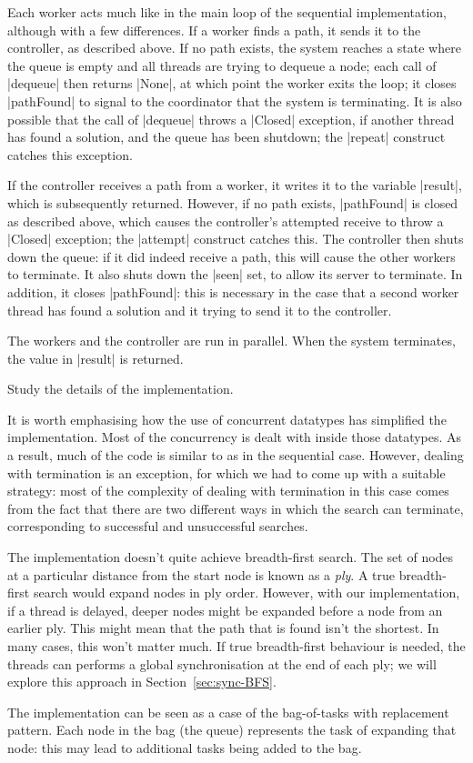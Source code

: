 
Each worker acts much like in the main loop of the sequential implementation,
although with a few differences.  If a worker finds a path, it sends it to the
controller, as described above.  If no path exists, the system reaches a state
where the queue is empty and all threads are trying to dequeue a node; each
call of |dequeue| then returns |None|, at which point the worker exits the
loop; it closes |pathFound| to signal to the coordinator that the system is
terminating.  It is also possible that the call of |dequeue| throws a |Closed|
exception, if another thread has found a solution, and the queue has been
shutdown; the |repeat| construct catches this exception.

If the controller receives a path from a worker, it writes it to the variable
|result|, which is subsequently returned.  However, if no path exists,
|pathFound| is closed as described above, which causes the controller's
attempted receive to throw a |Closed| exception; the |attempt| construct
catches this.  The controller then shuts down the queue: if it did indeed
receive a path, this will cause the other workers to terminate.  It also shuts
down the |seen| set, to allow its server to terminate.  In addition, it closes
|pathFound|: this is necessary in the case that a second worker thread has
found a solution and it trying to send it to the controller.

The workers and the controller are run in parallel.  When the system
terminates, the value in |result| is returned.

\begin{instruction}
Study the details of the implementation.
\end{instruction}

It is worth emphasising how the use of concurrent datatypes has simplified
the implementation.  Most of the concurrency is dealt with inside those
datatypes.  As a result, much of the code is similar to as in the sequential
case.  However, dealing with termination is an exception, for which we had to
come up with a suitable strategy: most of the complexity of dealing with
termination in this case comes from the fact that there are two different ways
in which the search can terminate, corresponding to successful and
unsuccessful searches.

The implementation doesn't quite achieve breadth-first search.  The set of
nodes at a particular distance from the start node is known as a
\emph{ply}.  A true breadth-first search would expand nodes in ply
order.  However, with our implementation, if a thread is delayed, deeper nodes
might be expanded before a node from an earlier ply.  This might mean that the
path that is found isn't the shortest.  In many cases, this won't matter much.
If true breadth-first behaviour is needed, the threads can performs a global
synchronisation at the end of each ply; we will explore this approach in
Section~\ref{sec:sync-BFS}.

The implementation can be seen as a case of the bag-of-tasks with replacement
pattern.  Each node in the bag (the queue) represents the task of expanding
that node: this may lead to additional tasks being added to the bag.

